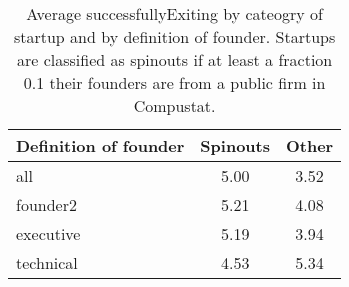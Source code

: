 \begin{table}[!htb]
\centering
\begingroup\small
\begin{tabular}{p{1.5cm}cc}
  \toprule
Definition of founder & Spinouts & Other \\ 
  \midrule
all & 5.00 & 3.52 \\ 
  founder2 & 5.21 & 4.08 \\ 
  executive & 5.19 & 3.94 \\ 
  technical & 4.53 & 5.34 \\ 
   \bottomrule
\end{tabular}
\endgroup
\caption{Average successfullyExiting by cateogry of startup and by definition of founder. Startups are classified as spinouts if at least a fraction 0.1 their founders are from a public firm in Compustat.} 
\label{table:raw_comparison_successfullyExiting}
\end{table}
